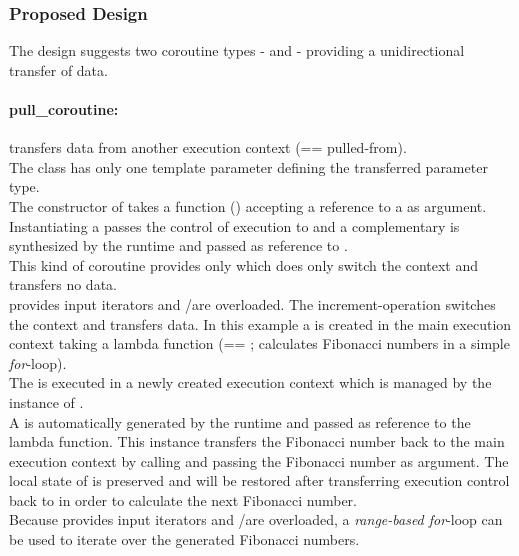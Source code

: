 
\subsubsection*{Proposed Design}
The design suggests two coroutine types - \pushcoro and \pullcoro - providing a
unidirectional transfer of data.

\paragraph*{pull\_coroutine:}
\pullcoro transfers data from another execution context (== pulled-from).\\
The class has only one template parameter defining the transferred parameter
type.\\
The constructor of \pullcoro takes a function (\corofunction) accepting a
reference to a \pushcoro as argument. Instantiating a \pullcoro passes the
control of execution to \corofunction and a complementary \pushcoro is
synthesized by the runtime and passed as reference to \corofunction.\\
\newline
This kind of coroutine provides only \pullcoroop which does only switch the
context and transfers no data.\\
\newline
\pullcoro provides input iterators and \bgin/\ed are overloaded. The
increment-operation switches the context and transfers data.
In this example a \pullcoro is created in the main execution context taking a
lambda function (== \corofunction; calculates Fibonacci numbers in a simple
\textit{for}-loop).\\
The \corofunction is executed in a newly created execution context which is
managed by the instance of \pullcoro.\\
A \pushcoro is automatically generated by the runtime and passed as reference to
the lambda function. This \pushcoro instance transfers the Fibonacci number back
to the main execution context by calling \pushcoroop and passing the Fibonacci
number as argument. The local state of \corofunction is preserved and will be
restored after transferring execution control back to \corofunction in order to
calculate the next Fibonacci number.\\
Because \pullcoro provides input iterators and \bgin/\ed are overloaded, a
\textit{range-based for}-loop can be used to iterate over the generated
Fibonacci numbers.

